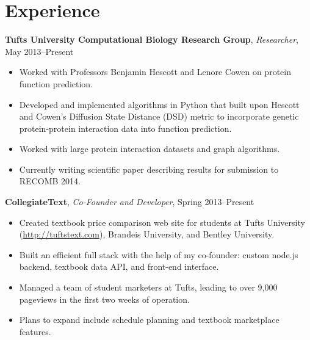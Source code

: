 \documentclass[10pt, letter]{article}
\begin{document}
\section*{Experience}
{\bf Tufts University Computational Biology Research Group}, {\em Researcher}, May 2013--Present\\
\vspace*{-.15in} 
\begin{itemize}[topsep=0pt,itemsep=-1pt]
    \item Worked with Professors Benjamin Hescott and Lenore Cowen on protein function prediction.
    \item Developed and implemented algorithms in Python that built upon Hescott and Cowen's Diffusion State Distance (DSD) metric to incorporate genetic protein-protein interaction data into function prediction.
    \item Worked with large protein interaction datasets and graph algorithms.
    \item Currently writing scientific paper describing results for submission to RECOMB 2014.
\end{itemize}
\vspace{6pt}
{\bf CollegiateText}, {\em Co-Founder and Developer}, Spring 2013--Present\\
\vspace*{-.15in}
\begin{itemize}[topsep=0pt,itemsep=-1pt]
            \item Created textbook price comparison web site for students at Tufts University (\url{http://tuftstext.com}), Brandeis University, and Bentley University.
            \item Built an efficient full stack with the help of my co-founder: custom node.js backend, textbook data API, and front-end interface. 
            \item Managed a team of student marketers at Tufts, leading to over 9,000 pageviews in the first two weeks of operation.
            \item Plans to expand include schedule planning and textbook marketplace features.
        \end{itemize}
\end{document}
